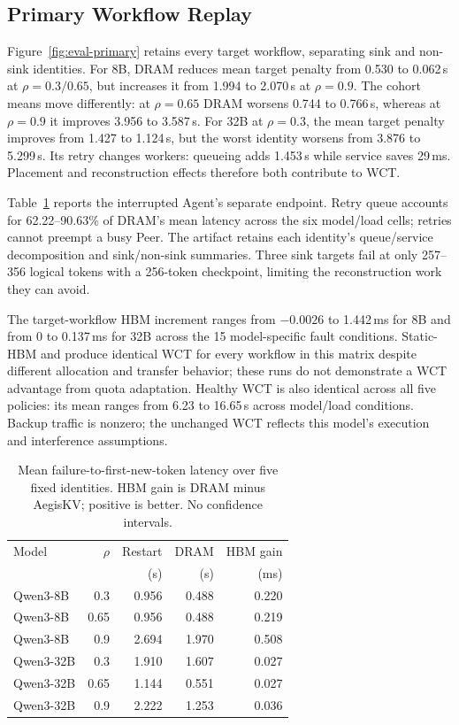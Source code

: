 \subsection{Primary Workflow Replay}
\label{sec:eval-primary}
Figure~\ref{fig:eval-primary} retains every target workflow, separating sink
and non-sink identities. For 8B, DRAM reduces mean target penalty from
0.530 to 0.062\,s at $\rho=0.3/0.65$, but increases it from 1.994 to
2.070\,s at $\rho=0.9$. The cohort means move differently: at $\rho=0.65$
DRAM worsens 0.744 to 0.766\,s, whereas at $\rho=0.9$ it improves 3.956 to
3.587\,s. For 32B at $\rho=0.3$, the mean target penalty improves from
1.427 to 1.124\,s, but the worst identity worsens from 3.876 to 5.299\,s.
Its retry changes workers: queueing adds 1.453\,s while service saves 29\,ms.
Placement and reconstruction effects therefore both contribute to WCT.

Table~\ref{tab:agent-failure-latency} reports the interrupted Agent's separate
endpoint. Retry queue accounts for 62.22--90.63\% of DRAM's mean latency
across the six model/load cells; retries cannot preempt a busy Peer.
The artifact retains
each identity's queue/service decomposition and sink/non-sink summaries.
Three sink targets fail at only 257--356 logical tokens with a 256-token
checkpoint, limiting the reconstruction work they can avoid.

The target-workflow HBM increment ranges from $-0.0026$ to 1.442\,ms for 8B
and from 0 to 0.137\,ms for 32B across the 15 model-specific fault conditions.
Static-HBM and \system produce identical WCT for every workflow in this
matrix despite different allocation and transfer behavior; these runs do not
demonstrate a WCT advantage from quota adaptation. Healthy WCT is also
identical across all five policies: its mean ranges from 6.23 to 16.65\,s
across model/load conditions. Backup traffic is nonzero; the unchanged WCT
reflects this model's execution and interference assumptions.

\begin{table}[t]
\centering
\setlength{\tabcolsep}{3pt}
\renewcommand{\arraystretch}{1.08}
\caption{Mean failure-to-first-new-token latency over five fixed identities.
HBM gain is DRAM minus AegisKV; positive is better. No confidence intervals.}
\label{tab:agent-failure-latency}
\begin{tabular}{@{}lrrrr@{}}
\hline
Model & $\rho$ & Restart & DRAM & HBM gain \\
 & & (s) & (s) & (ms) \\
\hline
Qwen3-8B & 0.3 & 0.956 & 0.488 & 0.220 \\
Qwen3-8B & 0.65 & 0.956 & 0.488 & 0.219 \\
Qwen3-8B & 0.9 & 2.694 & 1.970 & 0.508 \\
Qwen3-32B & 0.3 & 1.910 & 1.607 & 0.027 \\
Qwen3-32B & 0.65 & 1.144 & 0.551 & 0.027 \\
Qwen3-32B & 0.9 & 2.222 & 1.253 & 0.036 \\
\hline
\end{tabular}
\end{table}

